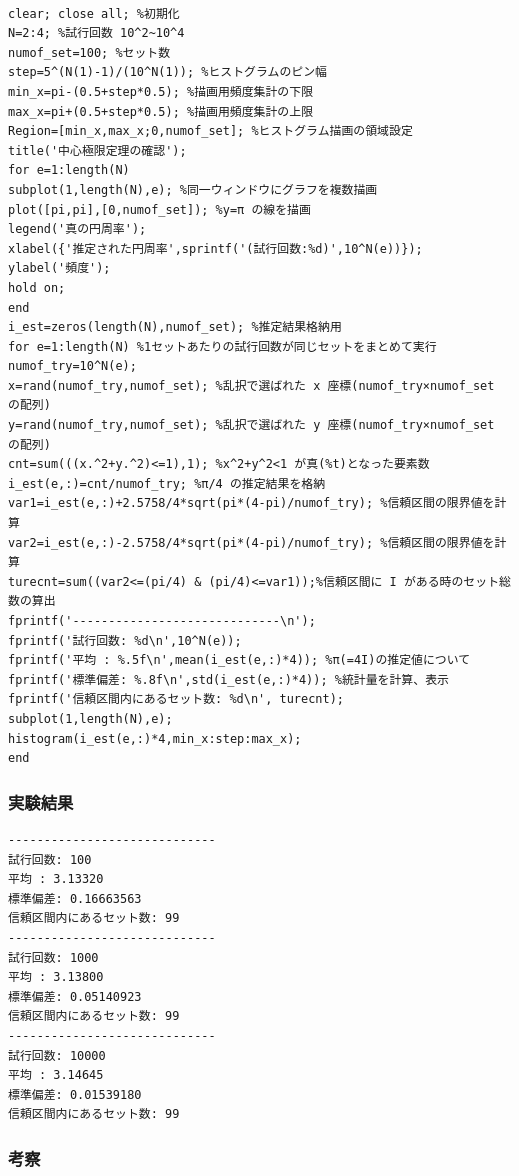 \documentclass[10pt,a4paper,titlepage]{jreport} %
\begin{document}
\begin{lstlisting}[caption=セット総数を求められるよう修正したプログラム]

clear; close all; %初期化
N=2:4; %試行回数 10^2~10^4 
numof_set=100; %セット数
step=5^(N(1)-1)/(10^N(1)); %ヒストグラムのピン幅
min_x=pi-(0.5+step*0.5); %描画用頻度集計の下限
max_x=pi+(0.5+step*0.5); %描画用頻度集計の上限
Region=[min_x,max_x;0,numof_set]; %ヒストグラム描画の領域設定
title('中心極限定理の確認');
for e=1:length(N)
subplot(1,length(N),e); %同一ウィンドウにグラフを複数描画
plot([pi,pi],[0,numof_set]); %y=π の線を描画
legend('真の円周率');
xlabel({'推定された円周率',sprintf('(試行回数:%d)',10^N(e))});
ylabel('頻度');
hold on;
end
i_est=zeros(length(N),numof_set); %推定結果格納用
for e=1:length(N) %1セットあたりの試行回数が同じセットをまとめて実行
numof_try=10^N(e);
x=rand(numof_try,numof_set); %乱択で選ばれた x 座標(numof_try×numof_set の配列)
y=rand(numof_try,numof_set); %乱択で選ばれた y 座標(numof_try×numof_set の配列)
cnt=sum(((x.^2+y.^2)<=1),1); %x^2+y^2<1 が真(%t)となった要素数
i_est(e,:)=cnt/numof_try; %π/4 の推定結果を格納
var1=i_est(e,:)+2.5758/4*sqrt(pi*(4-pi)/numof_try); %信頼区間の限界値を計算
var2=i_est(e,:)-2.5758/4*sqrt(pi*(4-pi)/numof_try); %信頼区間の限界値を計算
turecnt=sum((var2<=(pi/4) & (pi/4)<=var1));%信頼区間に I がある時のセット総数の算出
fprintf('-----------------------------\n');
fprintf('試行回数: %d\n',10^N(e));
fprintf('平均 : %.5f\n',mean(i_est(e,:)*4)); %π(=4I)の推定値について
fprintf('標準偏差: %.8f\n',std(i_est(e,:)*4)); %統計量を計算、表示
fprintf('信頼区間内にあるセット数: %d\n', turecnt);
subplot(1,length(N),e);
histogram(i_est(e,:)*4,min_x:step:max_x);
end
\end{lstlisting}

\subsubsection{実験結果}

\begin{lstlisting}[caption=課題（ii-a）実験結果]
-----------------------------
試行回数: 100
平均 : 3.13320
標準偏差: 0.16663563
信頼区間内にあるセット数: 99
-----------------------------
試行回数: 1000
平均 : 3.13800
標準偏差: 0.05140923
信頼区間内にあるセット数: 99
-----------------------------
試行回数: 10000
平均 : 3.14645
標準偏差: 0.01539180
信頼区間内にあるセット数: 99
\end{lstlisting}

\subsubsection{考察}
\end{document}
